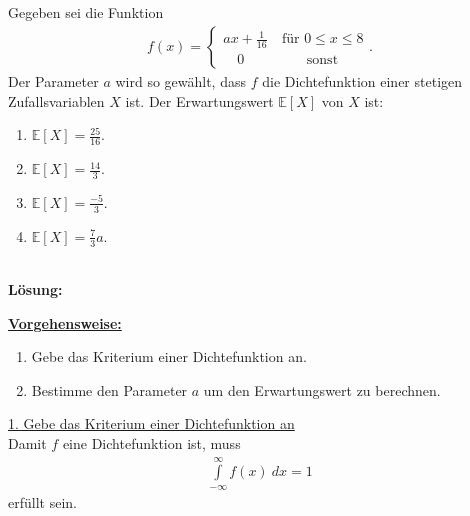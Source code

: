 \newpage

\subsection*{}
Gegeben sei die Funktion
\begin{align*}
f(x) = 
\begin{cases}
a x + \frac{1}{16} &\ \textrm{für } 0 \leq x \leq 8\\
\quad 0 &\qquad \textrm{sonst}
\end{cases}.
\end{align*}
Der Parameter $ a $ wird so gewählt, dass $ f $ die Dichtefunktion einer stetigen Zufallsvariablen $ X $ ist. Der Erwartungswert $ \mathbb{E}[X] $ von $ X $ ist:
\renewcommand{\labelenumi}{(\alph{enumi})}
\begin{enumerate}
\item 
$ \mathbb{E}[X] = \frac{25}{16} $.
\item
$ \mathbb{E}[X] = \frac{14}{3} $.

\item
$ \mathbb{E}[X] = \frac{-5}{3} $.
\item
$ \mathbb{E}[X] = \frac{7}{3} a $.
\end{enumerate}
\ \\
\textbf{Lösung:}
\begin{mdframed}
\underline{\textbf{Vorgehensweise:}}
\renewcommand{\labelenumi}{\theenumi.}
\begin{enumerate}
\item Gebe das Kriterium einer Dichtefunktion an.
\item Bestimme den Parameter $ a $ um den Erwartungswert zu berechnen.
\end{enumerate}
\end{mdframed}

\underline{1. Gebe das Kriterium einer Dichtefunktion an}\\
Damit $ f $ eine Dichtefunktion ist, muss
\begin{align*}
\int \limits_{- \infty}^\infty f(x) \ dx
= 
1
\end{align*}
erfüllt sein.\\
\\

